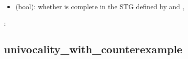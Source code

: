 \documentclass[letterpaper,10pt,english]{sphinxmanual}
\begin{document}
\begin{fulllineitems}
\begin{description}
\begin{itemize}
\end{itemize}

\item[{\sphinxstylestrong{returns}:}] \leavevmode\begin{itemize}
\item {} 
 (bool): whether  is complete in the STG defined by  and ,

\end{itemize}

\end{description}

:

\begin{sphinxVerbatim}[commandchars=\\\{\}]
 
\end{sphinxVerbatim}

\end{fulllineitems}



\subsection{univocality\_with\_counterexample}
\label{\detokenize{Attractors:id7}}\label{\detokenize{Attractors:univocality-with-counterexample}}
\end{document}
